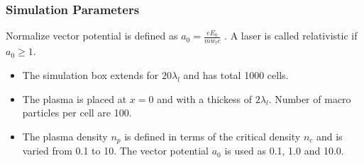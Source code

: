 \documentclass{beamer}
\begin{document}
{\begin{frame}
\end{frame}
\begin{frame}
    \small
    \frametitle{Simulation Parameters}
    Normalize vector potential is defined as
    $
        a_0 = \frac{eE_0}{m w_l c}
    $
    . A laser is called relativistic if $a_0 \ge 1$.
    \begin{itemize}
        \item The simulation box extends for $20 \lambda _l$ and has total 1000 cells.
        \item  The plasma is placed at $x=0$ and with a thickess of $2\lambda_l$.  Number of macro particles per cell are 100.
        \item The plasma density $n_p$ is defined in terms of the critical density $n_c$ and is varied from 0.1 to 10. The vector potential $a_0$ is used as 0.1, 1.0 and 10.0.
    \end{itemize}


\end{frame}}
\end{document}
